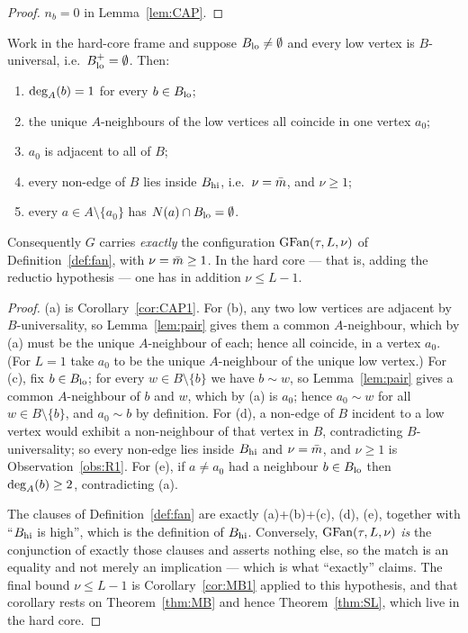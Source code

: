 \begin{proof}
$n_b = 0$ in Lemma~\ref{lem:CAP}.
\end{proof}

\begin{theorem}[rigidity]\label{thm:RIG}
Work in the hard-core frame and suppose $B_{\mathrm{lo}} \ne \emptyset$ and every low vertex is
$B$-universal, i.e.\ $B_{\mathrm{lo}}^{+} = \emptyset$. Then:
\begin{enumerate}[label=\textup{(\alph*)}]
\item $\mathrm{deg}_A(b) = 1$ for every $b \in B_{\mathrm{lo}}$;
\item the unique $A$-neighbours of the low vertices all coincide in one vertex $a_0$;
\item $a_0$ is adjacent to all of $B$;
\item every non-edge of $B$ lies inside $B_{\mathrm{hi}}$, i.e.\ $\nu = \bar{m}$, and $\nu \ge 1$;
\item every $a \in A \setminus \{a_0\}$ has $N(a) \cap B_{\mathrm{lo}} = \emptyset$.
\end{enumerate}
Consequently $G$ carries \emph{exactly} the configuration $\mathrm{GFan}(\tau,L,\nu)$ of
Definition~\ref{def:fan}, with $\nu = \bar{m} \ge 1$. In the hard core --- that is, adding the
reductio hypothesis --- one has in addition $\nu \le L-1$.
\end{theorem}

\begin{proof}
(a) is Corollary~\ref{cor:CAP1}. For (b), any two low vertices are adjacent by
$B$-universality, so Lemma~\ref{lem:pair} gives them a common $A$-neighbour, which by (a)
must be the unique $A$-neighbour of each; hence all coincide, in a vertex $a_0$. (For
$L = 1$ take $a_0$ to be the unique $A$-neighbour of the unique low vertex.) For (c), fix
$b \in B_{\mathrm{lo}}$; for every $w \in B \setminus \{b\}$ we have $b \sim w$, so
Lemma~\ref{lem:pair} gives a common $A$-neighbour of $b$ and $w$, which by (a) is $a_0$;
hence $a_0 \sim w$ for all $w \in B \setminus \{b\}$, and $a_0 \sim b$ by definition. For
(d), a non-edge of $B$ incident to a low vertex would exhibit a non-neighbour of that vertex
in $B$, contradicting $B$-universality; so every non-edge lies inside $B_{\mathrm{hi}}$ and
$\nu = \bar{m}$, and $\nu \ge 1$ is Observation~\ref{obs:R1}. For (e), if $a \ne a_0$ had a
neighbour $b \in B_{\mathrm{lo}}$ then $\mathrm{deg}_A(b) \ge 2$, contradicting (a).

The clauses of Definition~\ref{def:fan} are exactly (a)+(b)+(c), (d), (e), together with
``$B_{\mathrm{hi}}$ is high'', which is the definition of $B_{\mathrm{hi}}$. Conversely, $\mathrm{GFan}(\tau,L,\nu)$
\emph{is} the conjunction of exactly those clauses and asserts nothing else, so the match is
an equality and not merely an implication --- which is what ``exactly'' claims. The final
bound $\nu \le L-1$ is Corollary~\ref{cor:MB1} applied to this hypothesis, and that
corollary rests on Theorem~\ref{thm:MB} and hence Theorem~\ref{thm:SL}, which live in the
hard core.
\end{proof}

